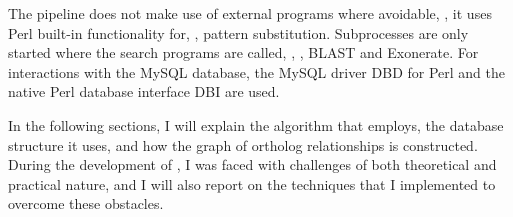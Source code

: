 The pipeline does not make use of external programs where avoidable, \ie, it
uses Perl built-in functionality for, \eg, pattern substitution. Subprocesses
are only started where the search programs are called, \ie, ,
BLAST and Exonerate. For interactions with the MySQL database, the MySQL driver
DBD for Perl and the native Perl database interface DBI are used.

In the following sections, I will explain the algorithm that \pname employs, the
database structure it uses, and how the graph of ortholog relationships is
constructed. During the development of \pname, I was faced with challenges of
both theoretical and practical nature, and I will also report on the techniques
that I implemented to overcome these obstacles.


